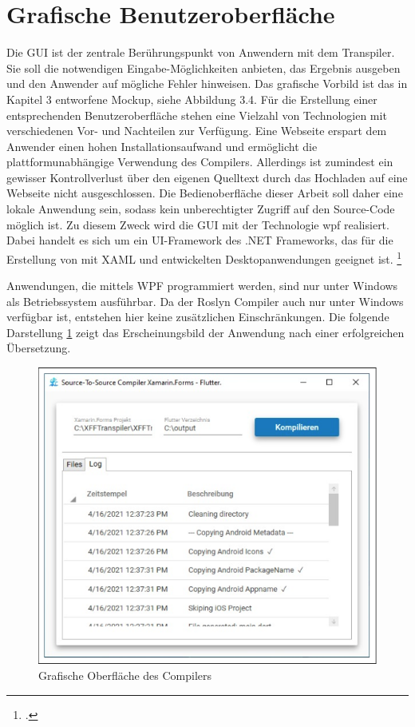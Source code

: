  


\section{Grafische Benutzeroberfläche}
Die GUI ist der zentrale Berührungspunkt von Anwendern mit dem Transpiler.  Sie soll die notwendigen Eingabe-Möglichkeiten anbieten, das Ergebnis ausgeben und den Anwender auf mögliche Fehler hinweisen.  Das grafische Vorbild ist das in Kapitel 3 entworfene Mockup, siehe Abbildung 3.4.  Für die Erstellung einer entsprechenden Benutzeroberfläche stehen eine Vielzahl von Technologien mit verschiedenen Vor- und Nachteilen zur Verfügung. Eine Webseite erspart dem Anwender einen hohen Installationsaufwand und ermöglicht die plattformunabhängige Verwendung des Compilers.  Allerdings ist zumindest ein gewisser Kontrollverlust über den eigenen Quelltext durch das  Hochladen auf eine Webseite nicht ausgeschlossen.  Die Bedienoberfläche dieser Arbeit soll daher eine lokale Anwendung sein, sodass kein  unberechtigter Zugriff auf den Source-Code möglich ist.  Zu diesem Zweck wird die GUI mit der Technologie \ac{wpf} realisiert.  Dabei handelt es sich um ein UI-Framework des .NET Frameworks, das für die Erstellung von mit XAML und \Csharp{} entwickelten Desktopanwendungen geeignet ist. \footcite[Vgl.][S. 1f]{Wenger2012} 

Anwendungen,  die mittels WPF programmiert werden, sind nur unter Windows als Betriebssystem ausführbar.  Da der Roslyn Compiler auch nur unter Windows verfügbar ist,  entstehen hier keine zusätzlichen Einschränkungen.  Die folgende Darstellung \ref{fig:CompilerUI} zeigt das Erscheinungsbild der Anwendung nach einer erfolgreichen Übersetzung.
\newpage
\begin{figure}[!ht]
 \includegraphics[width=\textwidth,keepaspectratio]{Images/Implementation/UiScreenshot.png}
 \caption{Grafische Oberfläche des Compilers}
 \label{fig:CompilerUI}
\end{figure}

